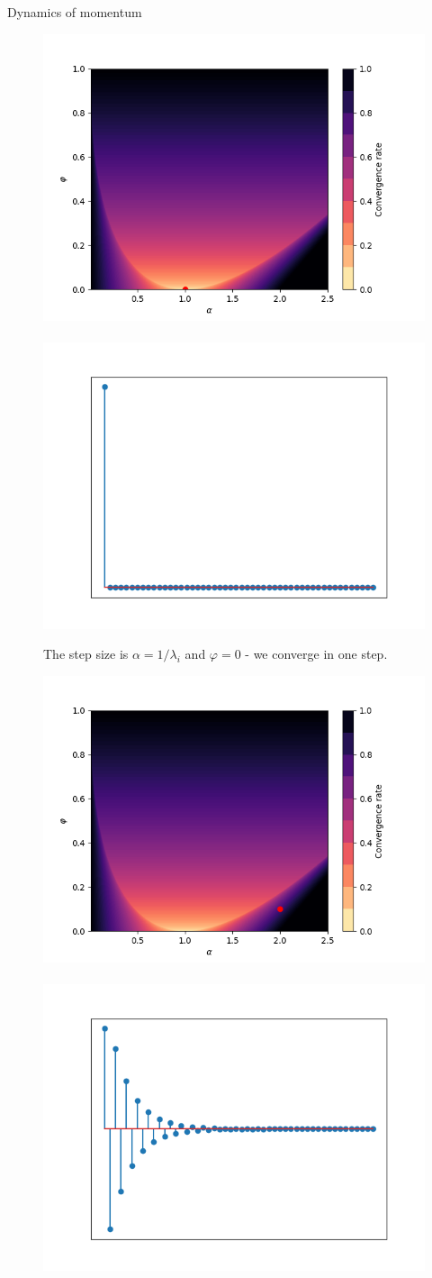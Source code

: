 \documentclass[11pt,compress,t,notes=noshow, xcolor=table]{beamer}
\begin{document}
\begin{vbframe}{Dynamics of momentum}
\framebreak
\vspace*{1.0cm}
\begin{figure}
	\includegraphics[height=0.35\textwidth, keepaspectratio]{figure_man/momentum_conv_1step.png} ~~ \includegraphics[height=0.35\textwidth, keepaspectratio]{figure_man/momentum_1step.png} \\
	\begin{footnotesize} 
		The step size is $\alpha = 1/\lambda_i$ and $\varphi = 0$ - we converge in one step.
	\end{footnotesize}
\end{figure}
\framebreak
\vspace*{1.0cm}
\begin{figure}
	\includegraphics[height=0.35\textwidth, keepaspectratio]{figure_man/momentum_conv_osc.png} ~~ \includegraphics[height=0.35\textwidth, keepaspectratio]{figure_man/momentum_osc.png} \\

\end{figure}
\end{vbframe}
\end{document}
